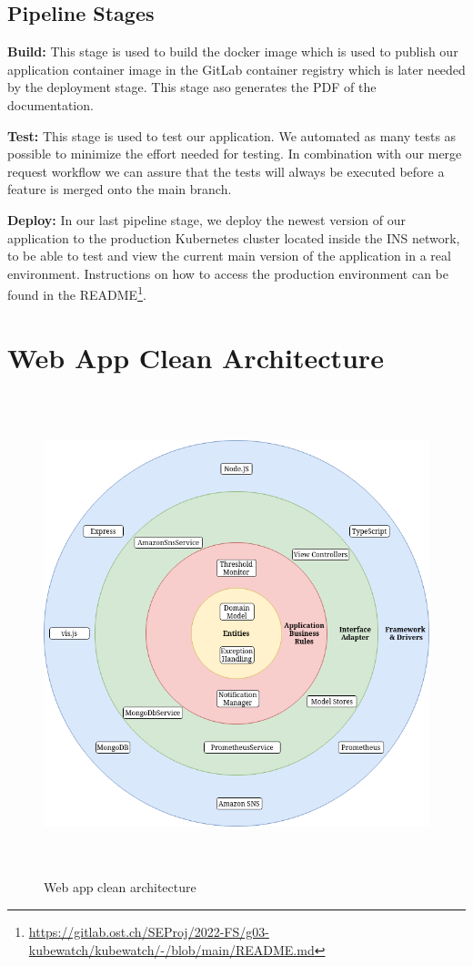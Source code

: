 \subsection{Pipeline Stages}
\textbf{Build:} This stage is used to build the docker image which is used to publish our application container image
in the GitLab container registry which is later needed by the deployment stage.
This stage aso generates the PDF of the documentation.

\noindent
\textbf{Test:} This stage is used to test our application.
We automated as many tests as possible to minimize the effort needed for testing.
In combination with our merge request workflow we can assure that the tests will always be executed
before a feature is merged onto the main branch.

\noindent
\textbf{Deploy:} In our last pipeline stage, we deploy the newest version of our application
to the production Kubernetes cluster located inside the INS network,
to be able to test and view the current main version of the application in a real environment.
Instructions on how to access the production environment can be found in the README\footnote{\url{https://gitlab.ost.ch/SEProj/2022-FS/g03-kubewatch/kubewatch/-/blob/main/README.md}}.


\section{Web App Clean Architecture}
\begin{figure}[H]
  \centering
  \includegraphics[height=14cm]{resources/clean_architecture.drawio.png}
  \caption{Web app clean architecture}
  \label{fig:web-app-architecture}
\end{figure}

